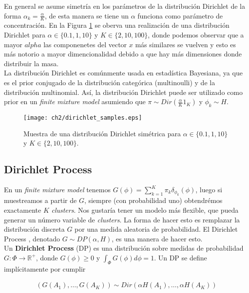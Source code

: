 \documentclass[letterpaper,12pt,oneside]{book} %
\begin{document}
En general se asume simetría en los parámetros de la distribución Dirichlet de la forma $\alpha_{k}=\frac{\alpha}{K}$, de esta manera se tiene un $\alpha$ funciona como parámetro de concentración. En la Figura \ref{img:dirichlet_samples} se oberva una realización de una distribución Dirichlet para $\alpha \in \{0.1, 1, 10\}$ y $K\in\{2, 10, 100\}$, donde podemos observar que a mayor $alpha$ las componenetes del vector $x$ más similares se vuelven y esto es más notorio a mayor dimencionalidad debido a que hay más dimensiones donde distribuir la masa.\\

La distribución Dirichlet es comúnmente usada en estadística Bayesiana, ya que es el prior conjugado de la distribución categórica (multinoulli) y de la distribución multinomial. Así, la distribución Dirichlet puede ser utilizado como prior en un \textit{finite mixture model} asumiendo que $\pi\sim Dir(\frac{\alpha}{K}1_{K})$ y $\phi_{k} \sim H$.

\begin{figure}
    \centering
    \texttt{[image: ch2/dirichlet\_samples.eps]}
    \caption{Muestra de una distribución Dirichlet simétrica para $\alpha \in \{0.1, 1, 10\}$ y $K\in\{2, 10, 100\}$.}
    \label{img:dirichlet_samples}
\end{figure}

\subsection{Dirichlet Process}
\label{sec:dp}

En un \textit{finite mixture model} tenemos $G(\phi) = \sum_{k=1}^{K} \pi_{k}\delta_{\phi_{k}}(\phi)$, luego si muestreamos a partir de $G$, siempre (con probabilidad uno) obtendrémos exactamente $K$ \textit{clusters}. Nos gustaría tener un modelo más flexible, que pueda generar un número variable de \textit{clusters}. La forma de hacer esto es remplazar la distribución discreta $G$ por una medida aleatoria de probabilidad. El Dirichlet Process \citep{ferguson1973bayesian}, denotado $G\sim DP(\alpha, H)$, es una manera de hacer esto.\\

Un \textbf{Dirichlet Process} (DP) es una distribución sobre medidas de probabilidad $G: \Phi \rightarrow \mathbb{R}^{+}$, donde $G(\phi)\geq 0$ y $\int_{\Phi}G(\phi)d\phi=1$. Un DP se define implícitamente por cumplir 

\begin{align}
    (G(A_{1}), \ldots, G(A_{K})) \sim Dir(\alpha H(A_{1}), \ldots, \alpha H(A_{K}))
\end{align}
\end{document}
